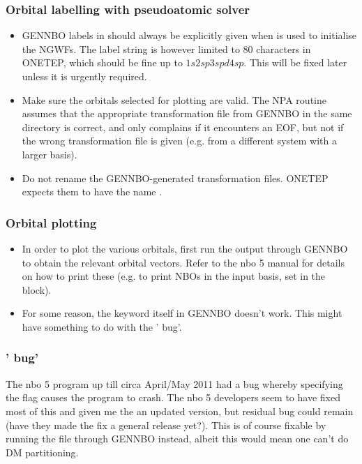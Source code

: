 \documentclass[letterpaper,10pt,english]{sphinxmanual}
\begin{document}
\subsubsection{Orbital labelling with pseudoatomic solver}
\label{\detokenize{nbo_onetep:orbital-labelling-with-pseudoatomic-solver}}\begin{itemize}
\item {} 
GENNBO labels in  should always be
explicitly given when  is used to initialise the NGWFs. The
label string is however limited to 80 characters in ONETEP, which
should be fine up to \(1s2sp3spd4sp\). This will be fixed later
unless it is urgently required.

\item {} 
Make sure the orbitals selected for plotting are valid. The NPA
routine assumes that the appropriate transformation file from GENNBO
in the same directory is correct, and only complains if it encounters
an EOF, but not if the wrong transformation file is given (e.g. from
a different system with a larger basis).

\item {} 
Do not rename the GENNBO-generated transformation files. ONETEP
expects them to have the name .

\end{itemize}


\subsubsection{Orbital plotting}
\label{\detokenize{nbo_onetep:orbital-plotting}}\begin{itemize}
\item {} 
In order to plot the various orbitals, first run the output
 through GENNBO to obtain the relevant orbital vectors.
Refer to the nbo 5 manual for details on how to print these (e.g. to
print NBOs in the input  basis, set  in the
 block).

\item {} 
For some reason, the  keyword itself in GENNBO doesn’t work.
This might have something to do with the ’ bug’.

\end{itemize}


\subsubsection{’ bug’}
\label{\detokenize{nbo_onetep:ortho-bug}}
The nbo 5 program up till circa April/May 2011 had a bug whereby
specifying the  flag causes the program to crash. The nbo 5
developers seem to have fixed most of this and given me the an updated
version, but residual bug could remain (have they made the fix a general
release yet?). This is of course fixable by running the
 file through GENNBO instead, albeit this
would mean one can’t do DM partitioning.
\end{document}
